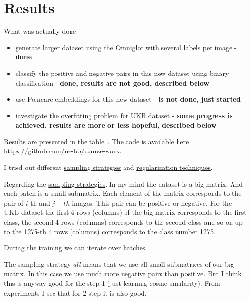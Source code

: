\documentclass[a4paper,12pt]{extreport}
\begin{document}
    \chapter{Results}\label{ch:results}

    What was actually done

    \begin{itemize}
        \item {generate larger dataset using the Omniglot with several labels per image - \textbf{done}}
        \item {classify the positive and negative pairs in this new dataset using binary classification - \textbf{done,
        results are not good, described below}}
        \item {use Poincare embeddings for this new dataset - \textbf{is not done, just started}}
        \item {investigate the overfitting problem for UKB dataset - \textbf{some progress is achieved,
        results are more or less hopeful, described below}}
    \end{itemize}

    Results are presented in the table~.
    The code is available here \url{https://github.com/ne-bo/course-work}.
    \newline

    I tried out different \underline{sampling strategies} and \underline{regularization techniques}.
    \newline

    Regarding the \underline{sampling strategies}. In my mind the dataset is a big matrix. And each batch is a small submatrix.
    Each element of the matrix corresponds to the pair of $i$-th and $j-th$ images. This pair can be positive or negative.
    For the UKB dataset the first 4 rows (columns) of the big matrix corresponds to the first class, the second 4 rows (columns)
    corresponds to the second class and so on up to the 1275-th 4 rows (columns) corresponds to the class number 1275.
    \newline

    During the training we can iterate over batches.
    \newline

    The sampling strategy \textit{all} means that we use all small submatrices of our big matrix.
    In this case we use much more negative pairs than positive. But I think this is anyway good for the step 1 (just learning cosine similarity).
    From experiments I see that for 2 step it is also good.
    \newline
\end{document}
